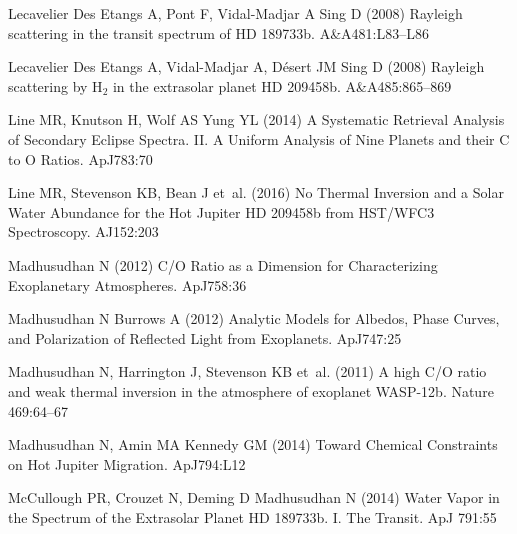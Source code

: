 \documentclass[graybox,natbib,nosecnum]{svmult}
\newcommand*\aap{A\&A}
\newcommand*\aj{AJ}
\newcommand*\apj{ApJ}
\newcommand*\apjl{ApJ}
\newcommand*\nat{Nature}
\begin{document}
\begin{thebibliography}{110}
{Lecavelier Des Etangs} A, {Pont} F, {Vidal-Madjar} A {Sing} D
  (2008{}) {Rayleigh scattering in the transit spectrum of HD
  189733b}. \aap 481:L83--L86

{Lecavelier Des Etangs} A, {Vidal-Madjar} A, {D{\'e}sert} JM {Sing} D
  (2008{}) {Rayleigh scattering by H$_{2}$ in the extrasolar planet
  HD 209458b}. \aap 485:865--869

{Line} MR, {Knutson} H, {Wolf} AS {Yung} YL (2014) {A Systematic Retrieval
  Analysis of Secondary Eclipse Spectra. II. A Uniform Analysis of Nine Planets
  and their C to O Ratios}. \apj 783:70

{Line} MR, {Stevenson} KB, {Bean} J et~al. (2016) {No Thermal Inversion and a
  Solar Water Abundance for the Hot Jupiter HD 209458b from HST/WFC3
  Spectroscopy}. \aj 152:203

{Madhusudhan} N (2012) {C/O Ratio as a Dimension for Characterizing
  Exoplanetary Atmospheres}. \apj 758:36

{Madhusudhan} N {Burrows} A (2012) {Analytic Models for Albedos, Phase Curves,
  and Polarization of Reflected Light from Exoplanets}. \apj 747:25

{Madhusudhan} N, {Harrington} J, {Stevenson} KB et~al. (2011) {A high C/O ratio
  and weak thermal inversion in the atmosphere of exoplanet WASP-12b}. \nat
  469:64--67

{Madhusudhan} N, {Amin} MA {Kennedy} GM (2014) {Toward Chemical Constraints on
  Hot Jupiter Migration}. \apjl 794:L12

{McCullough} PR, {Crouzet} N, {Deming} D {Madhusudhan} N (2014) {Water Vapor in
  the Spectrum of the Extrasolar Planet HD 189733b. I. The Transit}. \apj
  791:55


\end{thebibliography}
\end{document}
